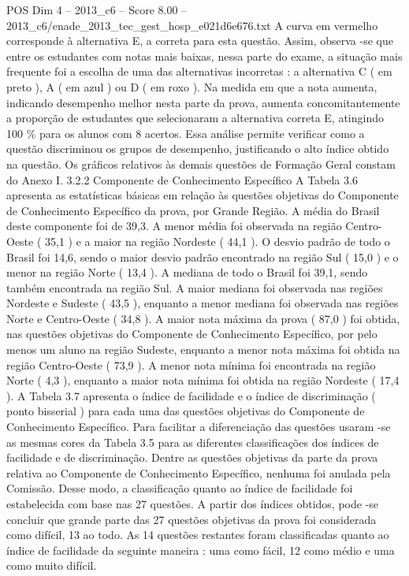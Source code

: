 \begin{textsample}{POS Dim 4 – 2013\_c6 – Score 8.00 – 2013\_c6/enade\_2013\_tec\_gest\_hosp\_e021d6e676.txt}
A curva em vermelho corresponde à alternativa E, a correta para esta questão.
Assim, observa -se que entre os estudantes com notas mais baixas, nessa parte do exame, a situação mais frequente foi a escolha de uma das alternativas incorretas : a alternativa C ( em preto ), A ( em azul ) ou D ( em roxo ).
Na medida em que a nota aumenta, indicando desempenho melhor nesta parte da prova, aumenta concomitantemente a proporção de estudantes que selecionaram a alternativa correta E, atingindo 100 \% para os alunos com 8 acertos.
Essa análise permite verificar como a questão discriminou os grupos de desempenho, justificando o alto índice obtido na questão.
Os gráficos relativos às demais questões de Formação Geral constam do Anexo I. 3.2.2 Componente de Conhecimento Específico A Tabela 3.6 apresenta as estatísticas básicas em relação às questões objetivas do Componente de Conhecimento Específico da prova, por Grande Região.
A média do Brasil deste componente foi de 39,3.
A menor média foi observada na região Centro-Oeste ( 35,1 ) e a maior na região Nordeste ( 44,1 ).
O desvio padrão de todo o Brasil foi 14,6, sendo o maior desvio padrão encontrado na região Sul ( 15,0 ) e o menor na região Norte ( 13,4 ).
A mediana de todo o Brasil foi 39,1, sendo também encontrada na região Sul.
A maior mediana foi observada nas regiões Nordeste e Sudeste ( 43,5 ), enquanto a menor mediana foi observada nas regiões Norte e Centro-Oeste ( 34,8 ).
A maior nota máxima da prova ( 87,0 ) foi obtida, nas questões objetivas do Componente de Conhecimento Específico, por pelo menos um aluno na região Sudeste, enquanto a menor nota máxima foi obtida na região Centro-Oeste ( 73,9 ).
A menor nota mínima foi encontrada na região Norte ( 4,3 ), enquanto a maior nota mínima foi obtida na região Nordeste ( 17,4 ).
A Tabela 3.7 apresenta o índice de facilidade e o índice de discriminação ( ponto bisserial ) para cada uma das questões objetivas do Componente de Conhecimento Específico.
Para facilitar a diferenciação das questões usaram -se as mesmas cores da Tabela 3.5 para as diferentes classificações dos índices de facilidade e de discriminação.
Dentre as questões objetivas da parte da prova relativa ao Componente de Conhecimento Específico, nenhuma foi anulada pela Comissão.
Desse modo, a classificação quanto ao índice de facilidade foi estabelecida com base nas 27 questões.
A partir dos índices obtidos, pode -se concluir que grande parte das 27 questões objetivas da prova foi considerada como difícil, 13 ao todo.
As 14 questões restantes foram classificadas quanto ao índice de facilidade da seguinte maneira : uma como fácil, 12 como médio e uma como muito difícil.

\end{textsample}
